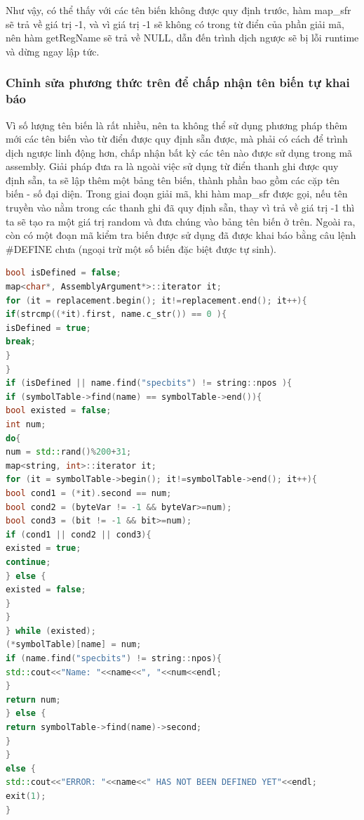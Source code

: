 Như vậy, có thể thấy với các tên biến không được quy định trước, hàm map\_sfr sẽ trả về giá trị -1, và vì giá trị -1 sẽ không có trong từ điển của phần giải mã, nên hàm getRegName sẽ trả về NULL, dẫn đến trình dịch ngược sẽ bị lỗi runtime và dừng ngay lập tức.\\


\subsubsection{Chỉnh sửa phương thức trên để chấp nhận tên biến tự khai báo}
Vì số lượng tên biến là rất nhiều, nên ta không thể sử dụng phương pháp thêm mới các tên biến vào từ điển được quy định sẵn được, mà phải có cách để trình dịch ngược linh động hơn, chấp nhận bất kỳ các tên nào được sử dụng trong mã assembly. Giải pháp đưa ra là ngoài việc sử dụng từ điển thanh ghi được quy định sẵn, ta sẽ lập thêm một bảng tên biến, thành phần bao gồm các cặp tên biến - số đại diện. Trong giai đoạn giải mã, khi hàm map\_sfr được gọi, nếu tên truyền vào nằm trong các thanh ghi đã quy định sẵn, thay vì trả về giá trị -1 thì ta sẽ tạo ra một giá trị random và đưa chúng vào bảng tên biến ở trên. Ngoài ra, còn có một đoạn mã kiểm tra biến được sử dụng đã được khai báo bằng câu lệnh \#DEFINE chưa (ngoại trừ một số biến đặc biệt được tự sinh). \\
\begin{lstlisting}[caption={Phần mã mới được bổ sung trong hàm map\_sfr},label={list:listmapsfrnew},language=c++]
bool isDefined = false;
map<char*, AssemblyArgument*>::iterator it;
for (it = replacement.begin(); it!=replacement.end(); it++){
if(strcmp((*it).first, name.c_str()) == 0 ){
isDefined = true;
break;
}
}
if (isDefined || name.find("specbits") != string::npos ){
if (symbolTable->find(name) == symbolTable->end()){
bool existed = false;
int num;
do{
num = std::rand()%200+31;
map<string, int>::iterator it;
for (it = symbolTable->begin(); it!=symbolTable->end(); it++){
bool cond1 = (*it).second == num;
bool cond2 = (byteVar != -1 && byteVar>=num);
bool cond3 = (bit != -1 && bit>=num);
if (cond1 || cond2 || cond3){
existed = true;
continue;
} else {
existed = false;
}
}
} while (existed); 
(*symbolTable)[name] = num;
if (name.find("specbits") != string::npos){
std::cout<<"Name: "<<name<<", "<<num<<endl;
}
return num;
} else {
return symbolTable->find(name)->second;
}
}
else {
std::cout<<"ERROR: "<<name<<" HAS NOT BEEN DEFINED YET"<<endl;
exit(1);
}
\end{lstlisting}
